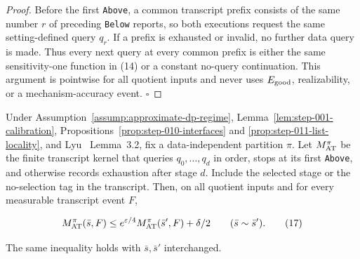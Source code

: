 \begin{proof}
Before the first \texttt{Above}, a common transcript prefix consists of the same
number \(r\) of preceding \texttt{Below} reports, so both executions request the
same setting-defined query \(q_r\). If a prefix is exhausted or invalid, no
further data query is made. Thus every next query at every common prefix is
either the same sensitivity-one function in (14) or a constant no-query
continuation. This argument is pointwise for all quotient inputs and never
uses \(E_{\rm good}\), realizability, or a mechanism-accuracy event.
\(\square\)


\end{proof}

\begin{proposition}\label{prop:step-011-at-privacy}
Under Assumption~\ref{assump:approximate-dp-regime},
Lemma~\ref{lem:step-001-calibration},
Propositions~\ref{prop:step-010-interfaces} and
\ref{prop:step-011-list-locality}, and Lyu~\citep{lyu2025}
Lemma~3.2, fix a
data-independent partition \(\pi\). Let \(M_{\rm AT}^{\pi}\) be the finite
transcript kernel that queries \(q_0,\ldots,q_d\) in order, stops at its
first \texttt{Above}, and otherwise records exhaustion after stage \(d\). Include
the selected stage or the no-selection tag in the transcript. Then, on all
quotient inputs and for every measurable transcript event \(F\),

\[
 M_{\rm AT}^{\pi}(\bar s,F)
 \leq e^{\varepsilon/4}
       M_{\rm AT}^{\pi}(\bar s',F)+\delta/2
 \qquad(\bar s\sim\bar s').
\tag{17}
\]

The same inequality holds with \(\bar s,\bar s'\) interchanged.


\end{proposition}

